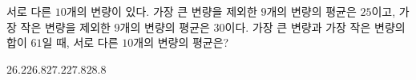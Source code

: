 서로 다른 $10$개의 변량이 있다. 가장 큰 변량을 제외한 $9$개의 변량의 평균은 $25$이고, 가장 작은 변량을 제외한 $9$개의 변량의 평균은 $30$이다. 가장 큰 변량과 가장 작은 변량의 합이 $61$일 때, 서로 다른 $10$개의 변량의 평균은?
\begin{choices32}{$26.2$}{$26.8$}{$27.2$}{$27.8$}{$28.8$}\end{choices32}

